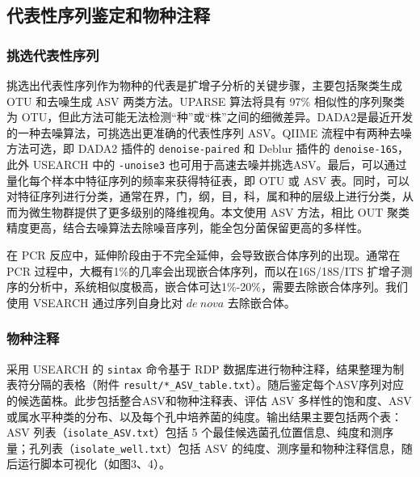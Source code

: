 \documentclass[UTF8]{ctexart}
\begin{document}
    

    \subsection{代表性序列鉴定和物种注释}

    \subsubsection{挑选代表性序列}

    挑选出代表性序列作为物种的代表是扩增子分析的关键步骤，主要包括聚类生成 OTU 和去噪生成 ASV 两类方法。UPARSE 算法将具有 97\% 相似性的序列聚类为 OTU，但此方法可能无法检测“种”或“株”之间的细微差异。DADA2是最近开发的一种去噪算法，可挑选出更准确的代表性序列 ASV。QIIME 流程中有两种去噪方法可选，即 DADA2 插件的 \verb|denoise-paired| 和 Deblur 插件的 \verb|denoise-16S|，此外 USEARCH 中的 \verb|-unoise3| 也可用于高速去噪并挑选ASV。最后，可以通过量化每个样本中特征序列的频率来获得特征表，即 OTU 或 ASV 表。同时，可以对特征序列进行分类，通常在界，门，纲，目，科，属和种的层级上进行分类，从而为微生物群提供了更多级别的降维视角。本文使用 ASV 方法，相比 OUT 聚类精度更高，结合去噪算法去除噪音序列，能全包分菌保留更高的多样性。

    在 PCR 反应中，延伸阶段由于不完全延伸，会导致嵌合体序列的出现。通常在 PCR 过程中，大概有1\%的几率会出现嵌合体序列，而以在16S/18S/ITS 扩增子测序的分析中，系统相似度极高，嵌合体可达1\%-20\%，需要去除嵌合体序列。我们使用 VSEARCH 通过序列自身比对 $de~nova$ 去除嵌合体。

    \subsubsection{物种注释}



    采用 USEARCH 的 \verb|sintax| 命令基于 RDP 数据库进行物种注释，结果整理为制表符分隔的表格（附件 \verb|result/*_ASV_table.txt|）。随后鉴定每个ASV序列对应的候选菌株。此步包括整合ASV和物种注释表、评估 ASV 多样性的饱和度、ASV 或属水平种类的分布、以及每个孔中培养菌的纯度。输出结果主要包括两个表：ASV 列表（\verb|isolate_ASV.txt|）包括 5 个最佳候选菌孔位置信息、纯度和测序量；孔列表（\verb|isolate_well.txt|）包括 ASV 的纯度、测序量和物种注释信息，随后运行脚本可视化（如图3、4）。
\end{document}
